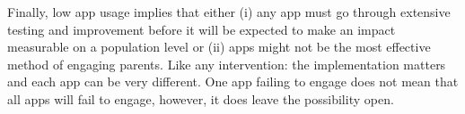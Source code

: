 \documentclass{article}
\begin{document}
Finally, low app usage implies that either (i) any app must go through extensive testing and improvement before it will be expected to make an impact measurable on a population level or (ii) apps might not be the most effective method of engaging parents. Like any intervention: the implementation matters and each app can be very different. One app failing to engage does not mean that all apps will fail to engage, however, it does leave the possibility open.







\end{document}
